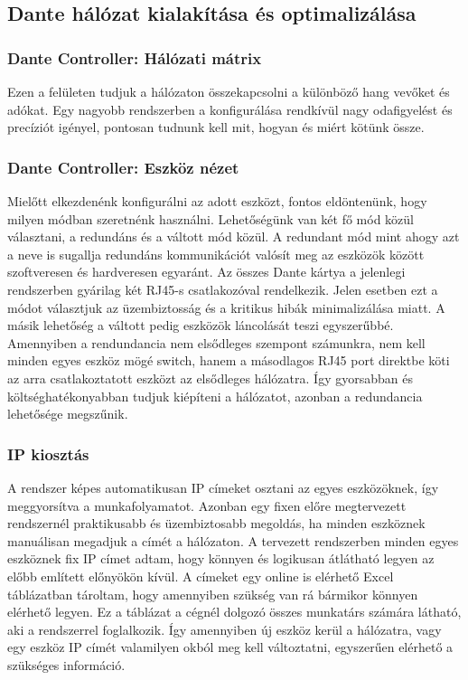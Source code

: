 \subsection{Dante hálózat kialakítása és optimalizálása}

\subsubsection{Dante Controller: Hálózati mátrix}

Ezen a felületen tudjuk a hálózaton összekapcsolni a különböző hang vevőket és
adókat. Egy nagyobb rendszerben a konfigurálása rendkívül nagy odafigyelést és
precíziót igényel, pontosan tudnunk kell mit, hogyan és miért kötünk össze.

\subsubsection{Dante Controller: Eszköz nézet}

Mielőtt elkezdenénk konfigurálni az adott eszközt, fontos eldöntenünk, hogy
milyen módban szeretnénk használni.
Lehetőségünk van két fő mód közül választani, a redundáns és a
váltott mód közül. A redundant mód mint ahogy azt a neve is sugallja
redundáns kommunikációt valósít meg az eszközök között szoftveresen és
hardveresen egyaránt. Az összes Dante kártya a jelenlegi rendszerben gyárilag két RJ45-s
csatlakozóval rendelkezik. Jelen esetben ezt a módot választjuk az
üzembiztosság és a kritikus hibák minimalizálása miatt.
A másik lehetőség a váltott pedig eszközök láncolását
teszi egyszerűbbé. Amennyiben a rendundancia nem elsődleges szempont számunkra, nem kell
minden egyes eszköz mögé switch, hanem a másodlagos RJ45 port direktbe köti
az arra csatlakoztatott eszközt az elsődleges hálózatra. Így gyorsabban és
költséghatékonyabban tudjuk kiépíteni a hálózatot, azonban a redundancia lehetősége megszűnik. 

\subsubsection{IP kiosztás}

A rendszer képes automatikusan IP címeket osztani az egyes eszközöknek, 
így meggyorsítva a munkafolyamatot.
Azonban egy fixen előre megtervezett rendszernél praktikusabb és
üzembiztosabb megoldás, ha minden eszköznek manuálisan megadjuk a címét a
hálózaton. A tervezett rendszerben minden egyes eszköznek fix IP címet adtam,
hogy könnyen és logikusan átlátható legyen az előbb említett előnyökön kívül.
A címeket egy online is elérhető Excel táblázatban tároltam, hogy amennyiben szükség van rá
bármikor könnyen elérhető legyen. Ez a táblázat a cégnél dolgozó összes munkatárs számára látható,
aki a rendszerrel foglalkozik. Így amennyiben új eszköz kerül a hálózatra, vagy egy eszköz IP címét
valamilyen okból meg kell változtatni, egyszerűen elérhető a szükséges információ.


